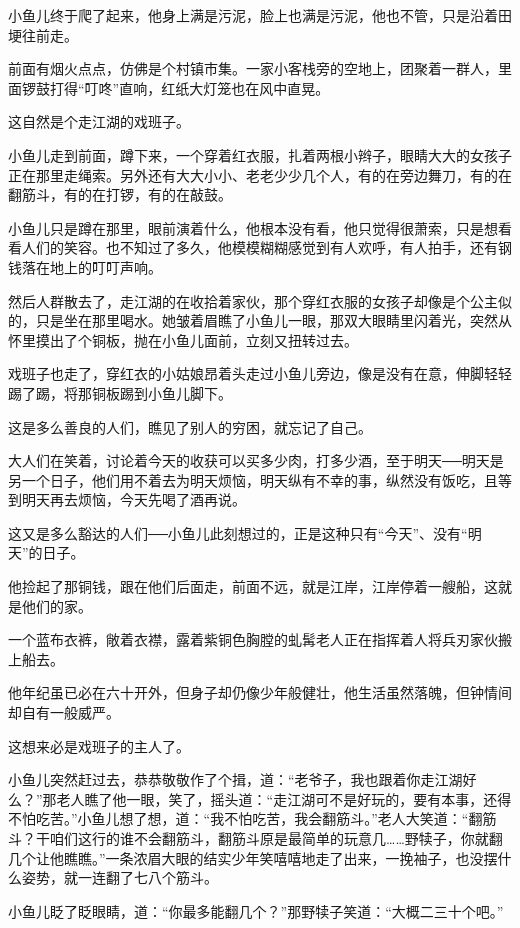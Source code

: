 \documentclass[12pt,oneside]{book}
\begin{document}
小鱼儿终于爬了起来，他身上满是污泥，脸上也满是污泥，他也不管，只是沿着田埂往前走。

前面有烟火点点，仿佛是个村镇市集。一家小客栈旁的空地上，团聚着一群人，里面锣鼓打得``叮咚''直响，红纸大灯笼也在风中直晃。

这自然是个走江湖的戏班子。

小鱼儿走到前面，蹲下来，一个穿着红衣服，扎着两根小辫子，眼睛大大的女孩子正在那里走绳索。另外还有大大小小、老老少少几个人，有的在旁边舞刀，有的在翻筋斗，有的在打锣，有的在敲鼓。

小鱼儿只是蹲在那里，眼前演着什么，他根本没有看，他只觉得很萧索，只是想看看人们的笑容。也不知过了多久，他模模糊糊感觉到有人欢呼，有人拍手，还有钢钱落在地上的叮叮声响。

然后人群散去了，走江湖的在收拾着家伙，那个穿红衣服的女孩子却像是个公主似的，只是坐在那里喝水。她皱着眉瞧了小鱼儿一眼，那双大眼睛里闪着光，突然从怀里摸出了个铜板，抛在小鱼儿面前，立刻又扭转过去。

戏班子也走了，穿红衣的小姑娘昂着头走过小鱼儿旁边，像是没有在意，伸脚轻轻踢了踢，将那铜板踢到小鱼儿脚下。

这是多么善良的人们，瞧见了别人的穷困，就忘记了自己。

大人们在笑着，讨论着今天的收获可以买多少肉，打多少酒，至于明天──明天是另一个日子，他们用不着去为明天烦恼，明天纵有不幸的事，纵然没有饭吃，且等到明天再去烦恼，今天先喝了酒再说。

这又是多么豁达的人们──小鱼儿此刻想过的，正是这种只有``今天''、没有``明天''的日子。

他捡起了那铜钱，跟在他们后面走，前面不远，就是江岸，江岸停着一艘船，这就是他们的家。

一个蓝布衣裤，敞着衣襟，露着紫铜色胸膛的虬髯老人正在指挥着人将兵刃家伙搬上船去。

他年纪虽已必在六十开外，但身子却仍像少年般健壮，他生活虽然落魄，但钟情间却自有一般威严。

这想来必是戏班子的主人了。

小鱼儿突然赶过去，恭恭敬敬作了个揖，道：``老爷子，我也跟着你走江湖好么？''那老人瞧了他一眼，笑了，摇头道：``走江湖可不是好玩的，要有本事，还得不怕吃苦。''小鱼儿想了想，道：``我不怕吃苦，我会翻筋斗。''老人大笑道：``翻筋斗？干咱们这行的谁不会翻筋斗，翻筋斗原是最简单的玩意几\ldots\ldots 野犊子，你就翻几个让他瞧瞧。''一条浓眉大眼的结实少年笑嘻嘻地走了出来，一挽袖子，也没摆什么姿势，就一连翻了七八个筋斗。

小鱼儿眨了眨眼睛，道：``你最多能翻几个？''那野犊子笑道：``大概二三十个吧。''
\end{document}
